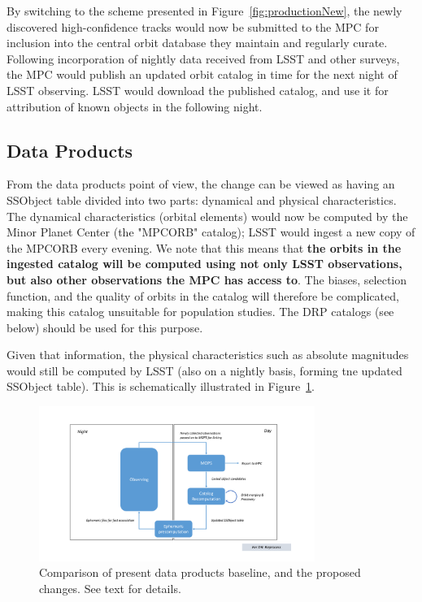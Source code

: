 \documentclass[DM,authoryear,toc]{lsstdoc}
\begin{document}
By switching to the scheme presented in Figure~\ref{fig:productionNew}, the newly discovered high-confidence tracks would now be submitted to the MPC for inclusion into the central orbit database they maintain and regularly curate. Following incorporation of nightly data received from LSST and other surveys, the MPC would publish an updated orbit catalog in time for the next night of LSST observing. LSST would download the published catalog, and use it for attribution of known objects in the following night.

\subsection{Data Products}

From the data products point of view, the change can be viewed as having an SSObject table divided into two parts: dynamical and physical characteristics. The dynamical characteristics (orbital elements) would now be computed by the Minor Planet Center (the "MPCORB" catalog); LSST would ingest a new copy of the MPCORB every evening. We note that this means that {\bf the orbits in the ingested catalog will be computed using not only LSST observations, but also other observations the MPC has access to}. The biases, selection function, and the quality of orbits in the catalog will therefore be complicated, making this catalog unsuitable for population studies. The DRP catalogs (see below) should be used for this purpose.

Given that information, the physical characteristics such as absolute magnitudes would still be computed by LSST (also on a nightly basis, forming tne updated SSObject table). This is schematically illustrated in Figure~\ref{fig:productsComparison}.

\begin{figure}
	\caption{Comparison of present data products baseline, and the proposed changes. See text for details.\label{fig:productsComparison}}
	\centering
	\includegraphics[page=3,width=0.8\textwidth]{figures/processing.pdf}
\end{figure}
\end{document}
